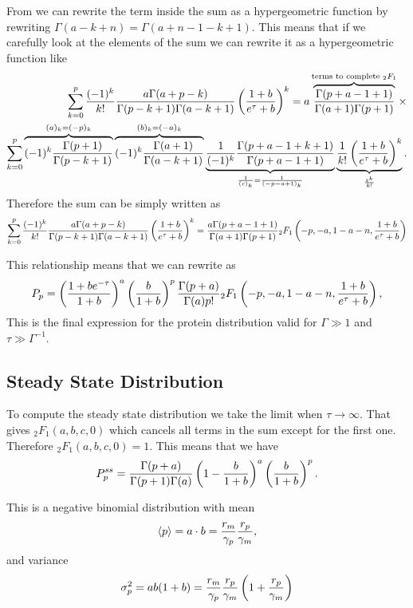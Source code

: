 From  we can rewrite the term inside the sum as a
hypergeometric function by rewriting $\Gamma(a - k + n) =
\Gamma(a + n - 1 - k + 1)$. This means that if we carefully look at the elements
of the sum we can rewrite it as a hypergeometric function like
\begin{align}
  \sum_{k=0}^p {(-1)^k \over k!}
  {a \Gamma(a + p - k) \over \Gamma(p - k + 1) \Gamma(a - k + 1)}
  \left( {1 + b \over e^\tau + b} \right)^k =
  a
  \overbrace{
  {\Gamma(p + a - 1 + 1) \over \Gamma(a + 1) \Gamma(p + 1)}
  }^{\text{terms to complete } {}_2F_1}
  \times \\
  \sum_{k=0}^p
  \overbrace{
  (-1)^k {\Gamma(p + 1) \over \Gamma(p - k + 1)}
  }^{(a)_k = (-p)_k}
  \overbrace{
  (-1)^k {\Gamma(a + 1) \over \Gamma(a - k + 1)}
  }^{(b)_k = (-a)_k}
  \underbrace{
  {1 \over (-1)^k }{\Gamma(p + a - 1 + k + 1) \over \Gamma(p + a - 1 + 1)}
  }_{{1 \over (c)_k} = {1 \over (-p - a + 1)_k}}
  \underbrace{
  {1 \over k!} \left( {1 + b \over e^\tau + b} \right)^k
  }_{z^k \over k!}.
\end{align}
Therefore the sum can be simply written as
\begin{equation}
\sum_{k=0}^p {(-1)^k \over k!}
  {a \Gamma(a + p - k) \over \Gamma(p - k + 1) \Gamma(a - k + 1)}
  \left( {1 + b \over e^\tau + b} \right)^k =
  {a \Gamma(p + a - 1 + 1) \over \Gamma(a + 1) \Gamma(p + 1)}
  {}_2F_1 \left( -p, -a, 1 - a - n, {1 + b \over e^\tau + b} \right)
\end{equation}

This relationship means that we can rewrite  as
\begin{equation}
  P_p = \left( {1 + b e^{-\tau} \over 1 + b} \right)^a
  \left( {b \over 1 + b} \right)^p
  {\Gamma(p + a) \over \Gamma(a) p!}
  {}_2F_1 \left( -p, -a, 1 - a - n, {1 + b \over e^\tau + b} \right),
\end{equation}
This is the final expression for the protein distribution valid for
$\Gamma \gg 1$ and $\tau \gg \Gamma^{-1}$.

\subsection{Steady State Distribution}
To compute the steady state distribution we take the limit when
$\tau \rightarrow \infty$. That gives ${}_2F_1(a, b, c, 0)$ which cancels all
terms in the sum except for the first one. Therefore ${}_2F_1(a, b, c, 0) = 1$.
This means that we have
\begin{equation}
  P_p^{ss} = {\Gamma(p + a) \over \Gamma(p + 1) \Gamma(a)}
  \left( 1 - {b \over 1 + b}  \right)^a
  \left( {b \over 1 + b} \right)^p.
\end{equation}

This is a negative binomial distribution with mean
\begin{equation}
  \left\langle p \right\rangle = a \cdot b =
  {r_m \over \gamma_p}{r_p \over \gamma_m},
\end{equation}
and variance
\begin{equation}
  \sigma_p^2 = ab(1 + b) =
  {r_m \over \gamma_p}{r_p \over \gamma_m} \left(1 + {r_p \over \gamma_m}\right)
\end{equation}
